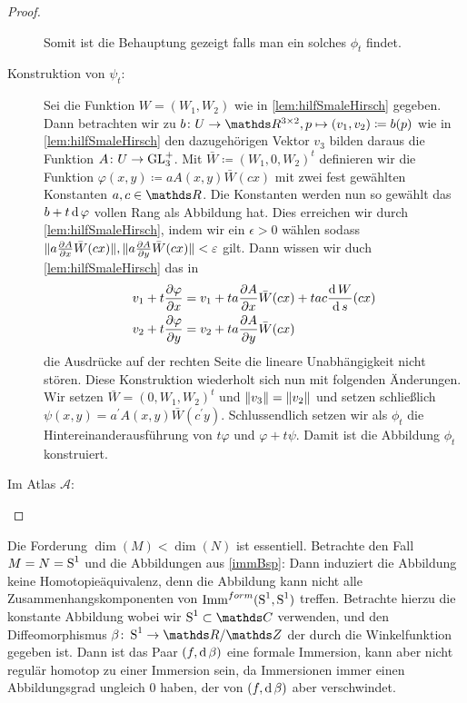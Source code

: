 \begin{Thm}
\begin{proof}
\begin{description}
			  Somit ist die Behauptung gezeigt falls man ein solches $ \phi_t $
			  findet. 
			  
			  \item[Konstruktion von $ \psi_t $:] Sei die Funktion $ W=(W_1,W_2) $ wie in \cref{lem:hilfSmaleHirsch} gegeben. Dann 
			  betrachten wir zu $ \abb{b}{U}{\R^{3\times 2}} , p\mapsto (v_1,v_2) \coloneqq b(p) $ wie in \cref{lem:hilfSmaleHirsch}
			  den dazugehörigen Vektor $ v_3 $ bilden daraus die Funktion
			  $ \abb{A}{U}{\GL_3^+} $. Mit $ \bar{W}\coloneqq (W_1,0,W_2)^t$ 
			  definieren wir die Funktion $ \varphi(x,y)\coloneqq aA(x,y)\bar{W}(cx) $ mit zwei fest gewählten Konstanten $ a,c\in\R $. Die Konstanten werden nun so gewählt das
			  $ b + t\d \varphi $ vollen Rang als Abbildung hat. Dies 
			  erreichen wir durch \cref{lem:hilfSmaleHirsch}, indem 
			  wir ein $ \epsilon > 0 $ wählen sodass $ \norm{a \frac{\partial A}{\partial x} \bar{W}(cx)},\norm{a \frac{\partial A}{\partial y}\bar{W}(cx)} < \epsilon $ gilt. Dann wissen wir duch \cref{lem:hilfSmaleHirsch} das in
			  \begin{align*}
			  	v_1 + t \frac{\partial \varphi}{\partial x} &= v_1 + ta\frac{\partial A}{\partial x} \bar{W}(cx) + tac\frac{\d W}{\d s}(cx) \\
			  	v_2 + t \frac{\partial \varphi}{\partial y} &= v_2 + ta \frac{\partial A}{\partial y} \bar{W}(cx)
			  \end{align*}
			  die Ausdrücke auf der rechten Seite die lineare Unabhängigkeit
			  nicht stören.
			  Diese Konstruktion wiederholt sich nun mit folgenden Änderungen.
			  Wir setzen $ \bar{W}=(0,W_1,W_2)^t $ und $ \norm{v_3}=\norm{v_2} $ und setzen schließlich $ \psi(x,y) = a^{'}A(x,y)\bar{W}(c^{'}y) $. 
			  Schlussendlich setzen wir als $ \phi_t $ die Hintereinanderausführung von $ t\varphi $ und $ \varphi + t\psi $. Damit ist die Abbildung $ \phi_t $ konstruiert.
			  
			\item[Im Atlas $ \mathcal{A} $:] 
			\end{description}
	\end{proof}
	
\end{Thm}

\begin{Bsp}
	Die Forderung $ \dim(M)<\dim(N) $ ist essentiell. Betrachte 
	den Fall $ M=N=\S^1 $ und die Abbildungen aus \cref{immBsp}:
	Dann induziert die Abbildung 
	keine Homotopieäquivalenz, denn die Abbildung kann
	nicht alle Zusammenhangskomponenten von $ \Immf{\S^1}{\S^1} $
	treffen. Betrachte hierzu die konstante Abbildung
	 wobei wir $ \S^1\subset\c$ 
	verwenden, und den Diffeomorphismus $ \abb{\beta}{\S^1}{\R / \Z} $
	der durch die Winkelfunktion gegeben ist. Dann ist das Paar $ (f,\d \beta) $ eine formale Immersion, kann aber nicht regulär
	homotop zu einer Immersion sein, da Immersionen immer einen 
	Abbildungsgrad ungleich $ 0 $ haben, der von $ (f,\d \beta) $ aber
	verschwindet.
\end{Bsp}


